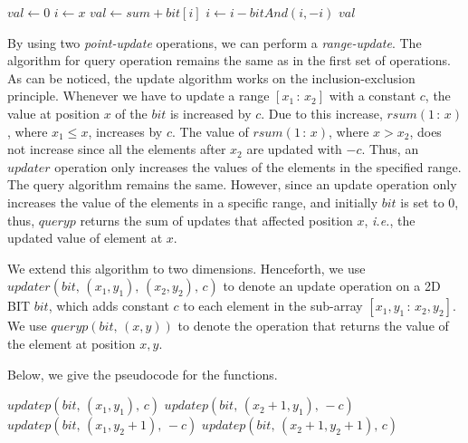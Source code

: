 \documentclass[a4paper]{article}
\begin{document}
\vspace {3 mm}
\noindent
{}
\begin{algorithmic}[1]

        \State $val \gets 0$
        \State $i \gets x$
            \State $val \gets sum + bit[i]$
            \State $i \gets i - bitAnd(i, -i)$
        \EndWhile
        \State \Return $val$
\EndFunction
\end{algorithmic}

\vspace{3 mm}
By using two \textit{point-update} operations, we can perform a \textit{range-update}. The algorithm for query operation remains the same as in the first set of operations. As can be noticed, the update algorithm works on the inclusion-exclusion principle. Whenever we have to update a range $[x_1\, :\, x_2]$ with a constant $c$, the value at position $x$ of the $bit$ is increased by $c$. Due to this increase, $rsum(1\, : \,x)$, where $x_1 \leq x$, increases by $c$. The value of $rsum(1\, : \,x)$, where $x > x_2$, does not increase since all the elements after $x_2$ are updated with $-c$. Thus, an $updater$ operation only increases the values of the elements in the specified range.\\
The query algorithm remains the same. However, since an update operation only increases the value of the elements in a specific range, and initially $bit$ is set to 0, thus, $queryp$ returns the sum of updates that affected position $x$, \textit{i.e.}, the updated value of element at $x$. 

\vspace{2 mm}
We extend this algorithm to two dimensions. Henceforth, we use $updater(bit,\, (x_1, y_1),\, (x_2, y_2),\, c)$ to denote an update operation on a 2D BIT $bit$, which adds constant $c$ to each element in the sub-array $[x_1, y_1\, :\, x_2, y_2]$. We use $queryp(bit,\, (x, y) )$ to denote the operation that returns the value of the element at position $x, y$.

\vspace{2 mm}
Below, we give the pseudocode for the functions.

\vspace {3 mm}
\noindent
{}
\begin{algorithmic}[1]

        \State $updatep(bit,\, (x_1, y_1),\, c)$
        \State $updatep(bit,\, (x_2+1, y_1),\, -c)$
        \State $updatep(bit,\, (x_1, y_2+1),\, -c)$
        \State $updatep(bit,\, (x_2+1, y_2+1),\, c)$
\EndFunction
\end{algorithmic}
\end{document}
